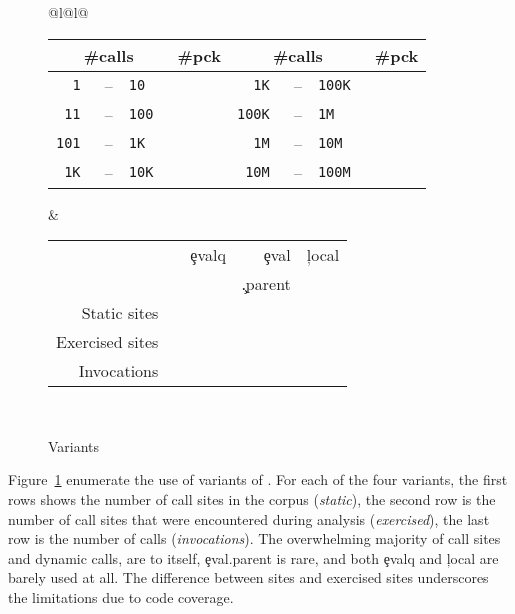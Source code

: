 \documentclass[screen,acmsmall]{acmart}
\begin{document}
\begin{figure}[b]

\begin{tabular}{@{}l@{\hspace{1.5cm}}l@{}}
\begin{minipage} {5cm}
  \begin{tabular}{|r@{\,}r@{\,}l@{}r|r@{\,}r@{\,}l@{}r|} \hline
    \multicolumn{3}{|c}{\small\#calls} &\small \#pck
&     \multicolumn{3}{c}{\small\#calls} &\small\#pck \\\hline
\tt 1 &--& \tt 10      & \packageBina  & \tt 1K &--&\tt 100K  & \packageBine\\
\tt 11 &--& \tt 100    & \packageBinb  & \tt 100K &--&\tt 1M  & \packageBinf\\
\tt 101 &--& \tt 1K    & \packageBinc  & \tt 1M &--&\tt 10M   & \packageBing\\
\tt 1K &--& \tt 10K    & \packageBind  & \tt 10M &--& \tt 100M & \packageBinh\\\hline
\end{tabular}
\caption{Call frequency}\label{freq}
\end{minipage}
&
\begin{minipage}{7cm}
\begin{tabular}{|@{\,}r|rrrr|}\hline
  &\eval & \c{evalq} & \c{eval} & \c{local}\\[-2mm]
           & & & \c{.parent} &\\\hline
\small Static sites &\packageStaticeval&\packageStaticevalq&\packageStaticevalparent&\packageStaticlocal \\
\small Exercised sites&\packageTriggeredeval&\packageTriggeredevalq&\packageTriggeredevalparent&\packageTriggeredlocal\\
\small Invocations&\packageEvalsRnd&\packageEvalqsRnd&\packageEparentsRnd&\packageLocalsRnd\\\hline
\end{tabular}~\\[2mm]\caption{Variants}\label{tab:variantseval}
\end{minipage}\end{tabular}\end{figure}


Figure~\ref{tab:variantseval} enumerate the use of variants of \eval. For each
of the four variants, the first rows shows the number of call sites in the
corpus (\emph{static}), the second row is the number of call sites that were
encountered during analysis (\emph{exercised}), the last row is the number of
calls (\emph{invocations}). The overwhelming majority of call sites and dynamic
calls, are to \eval itself, \c{eval.parent} is rare, and both \c{evalq} and
\c{local} are barely used at all. The difference between sites and exercised
sites underscores the limitations due to code coverage.
\end{document}

